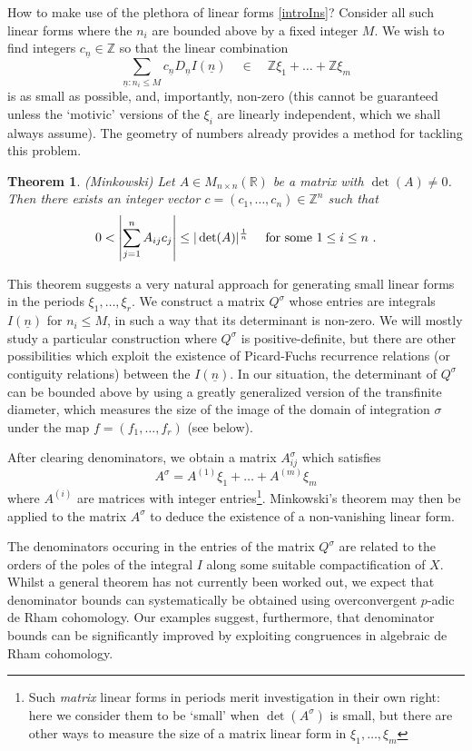 \documentclass[a4paper,10pt]{amsart}
\newtheorem{thm}{Theorem}[section]
\theoremstyle{definition}
\theoremstyle{remark}
\numberwithin{equation}{section}
\newcommand{\Z}{\mathbb Z}
\newcommand{\R}{\mathbb R}
\newcommand{\0}{\color{blue}{\mathsf{0}}}
\begin{document}
How to make use of the plethora of linear forms \eqref{introIns}? Consider all such linear forms where the $n_i$ are bounded above by a fixed integer $M$.  We wish to find integers $c_{\underline{n}}\in \Z$ so that the linear combination   
\[  \sum_{\underline{n}: n_i\leq M}  c_{\underline{n}}  D_{\underline{n}} I(\underline{n})  \quad \in \quad  \Z \xi_1 + \ldots + \Z \xi_m  \]
is as small as possible, and, importantly, non-zero (this cannot be guaranteed unless  the `motivic' versions \cite{NotesMot} of the $\xi_i$  are  linearly independent,  which we shall always assume).  The geometry of numbers already provides a method for tackling this problem.

\begin{thm} (Minkowski) Let $A \in M_{n\times n} (\R)$ be a matrix with $\det(A) \neq 0$. Then there exists an integer vector $c = (c_1,\ldots, c_n) \in \Z^n$ such that 
\[ 0 <  \left|  \sum_{j=1}^n A_{ij} c_j  \right| \leq |\det(A)|^{\frac{1}{n}} \quad \hbox{ for some } 1\leq i \leq n \ . \]
\end{thm}

This theorem suggests a very natural approach for generating small linear forms in the periods $\xi_1,\ldots, \xi_r$.  We  construct a matrix $Q^{\sigma}$ whose entries are integrals $I(\underline{n})$ for $n_i \leq M$, in such a way that its determinant  is non-zero. We will mostly  study a particular construction where   $Q^{\sigma}$ is positive-definite, but there are other possibilities which exploit the existence of Picard-Fuchs recurrence relations (or contiguity relations) between the $I(\underline{n})$.  In our situation, the determinant of $Q^{\sigma}$ can be bounded  above by using a greatly generalized version of the transfinite diameter, which  measures  the size of the image of the domain of integration $\sigma$ under the map $f=(f_1,\ldots, f_r)$ (see below). 

After clearing denominators, we obtain a matrix $A^{\sigma}_{ij}$ which satisfies 
\[  A^{\sigma} = A^{(1)} \xi_1 + \ldots +  A^{(m)} \xi_m\]
where $A^{(i)}$ are matrices with integer entries\footnote{Such  \emph{matrix} linear forms in periods merit investigation in their own right: here we consider them to be `small' when $\det(A^{\sigma})$ is small, but there are other ways to measure the size of a matrix  linear form in $\xi_1,\ldots, \xi_m$}. Minkowski's theorem may then be applied to the matrix $A^{\sigma}$ to deduce the existence of a non-vanishing linear form.  

The denominators occuring in the entries of the matrix $Q^{\sigma}$ are related to the orders of the poles of the integral $I$ along some suitable compactification of $X$. Whilst a general theorem  has not currently been worked out, we expect that  denominator bounds can systematically be obtained  using  overconvergent  $p$-adic de Rham cohomology. Our examples suggest, furthermore,  that denominator bounds can be significantly improved  by exploiting   congruences  in algebraic de Rham cohomology. 
\end{document}
